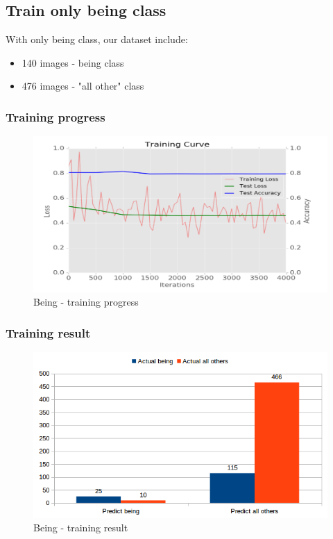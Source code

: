 \documentclass[11pt]{article}
\begin{document}
\subsection{Train only being class}
With only being class, our dataset include: 
\begin{itemize}
\item 140 images - being class
\item 476 images - "all other" class
\end{itemize}

\subsubsection{Training progress}

\begin{figure}[H]
\centering
\includegraphics[width=1\textwidth]{images/train_only_being}
\caption{Being - training progress}
\end{figure}

\subsubsection{Training result}

\begin{figure}[H]
\centering
\includegraphics[width=1\textwidth]{images/being}
\caption{Being - training result}
\end{figure}
\end{document}
